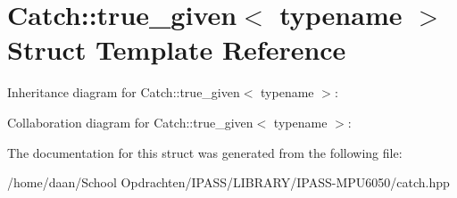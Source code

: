 \hypertarget{structCatch_1_1true__given}{}\section{Catch\+:\+:true\+\_\+given$<$ typename $>$ Struct Template Reference}
\label{structCatch_1_1true__given}


Inheritance diagram for Catch\+:\+:true\+\_\+given$<$ typename $>$\+:


Collaboration diagram for Catch\+:\+:true\+\_\+given$<$ typename $>$\+:


The documentation for this struct was generated from the following file\+:\begin{DoxyCompactItemize}
\item 
/home/daan/\+School Opdrachten/\+I\+P\+A\+S\+S/\+L\+I\+B\+R\+A\+R\+Y/\+I\+P\+A\+S\+S-\/\+M\+P\+U6050/catch.\+hpp\end{DoxyCompactItemize}

